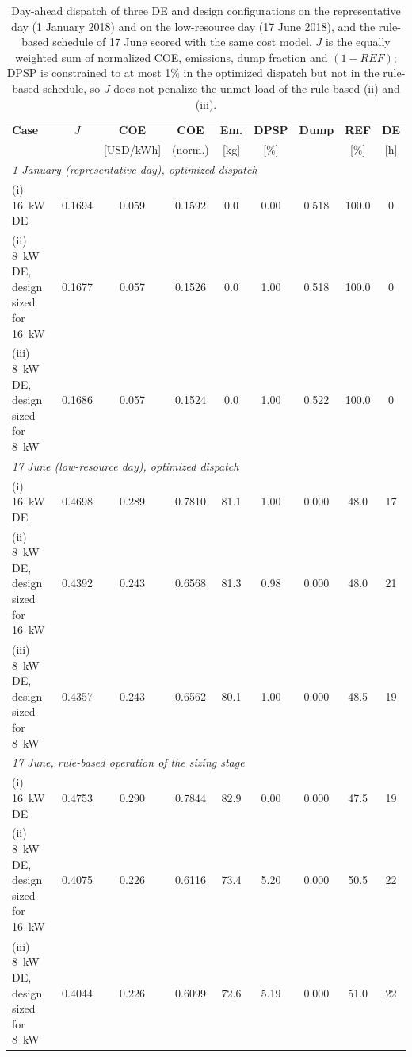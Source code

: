 \documentclass[final,3p,times]{elsarticle}
\begin{document}
\begin{table}[htbp]
\centering
\small
\begin{tabular}{l c c c c c c c c}
\toprule
\textbf{Case} & \textbf{$J$} & \textbf{COE} & \textbf{COE} & \textbf{Em.} & \textbf{DPSP} & \textbf{Dump} & \textbf{REF} & \textbf{DE} \\
 & & [USD/kWh] & (norm.) & [kg] & [\%] & & [\%] & [h] \\
\midrule
\multicolumn{9}{l}{\textit{1 January (representative day), optimized dispatch}} \\
(i) 16~kW DE & 0.1694 & 0.059 & 0.1592 & 0.0 & 0.00 & 0.518 & 100.0 & 0 \\
(ii) 8~kW DE, design sized for 16~kW & 0.1677 & 0.057 & 0.1526 & 0.0 & 1.00 & 0.518 & 100.0 & 0 \\
(iii) 8~kW DE, design sized for 8~kW & 0.1686 & 0.057 & 0.1524 & 0.0 & 1.00 & 0.522 & 100.0 & 0 \\
\midrule
\multicolumn{9}{l}{\textit{17 June (low-resource day), optimized dispatch}} \\
(i) 16~kW DE & 0.4698 & 0.289 & 0.7810 & 81.1 & 1.00 & 0.000 & 48.0 & 17 \\
(ii) 8~kW DE, design sized for 16~kW & 0.4392 & 0.243 & 0.6568 & 81.3 & 0.98 & 0.000 & 48.0 & 21 \\
(iii) 8~kW DE, design sized for 8~kW & 0.4357 & 0.243 & 0.6562 & 80.1 & 1.00 & 0.000 & 48.5 & 19 \\
\midrule
\multicolumn{9}{l}{\textit{17 June, rule-based operation of the sizing stage}} \\
(i) 16~kW DE & 0.4753 & 0.290 & 0.7844 & 82.9 & 0.00 & 0.000 & 47.5 & 19 \\
(ii) 8~kW DE, design sized for 16~kW & 0.4075 & 0.226 & 0.6116 & 73.4 & 5.20 & 0.000 & 50.5 & 22 \\
(iii) 8~kW DE, design sized for 8~kW & 0.4044 & 0.226 & 0.6099 & 72.6 & 5.19 & 0.000 & 51.0 & 22 \\
\bottomrule
\end{tabular}
\caption{\label{tab:DG_size} Day-ahead dispatch of three DE and design configurations on the representative day (1 January 2018) and on the low-resource day (17 June 2018), and the rule-based schedule of 17 June scored with the same cost model. $J$ is the equally weighted sum of normalized COE, emissions, dump fraction and $(1-REF)$; DPSP is constrained to at most 1\% in the optimized dispatch but not in the rule-based schedule, so $J$ does not penalize the unmet load of the rule-based (ii) and (iii).}
\end{table}
\end{document}

